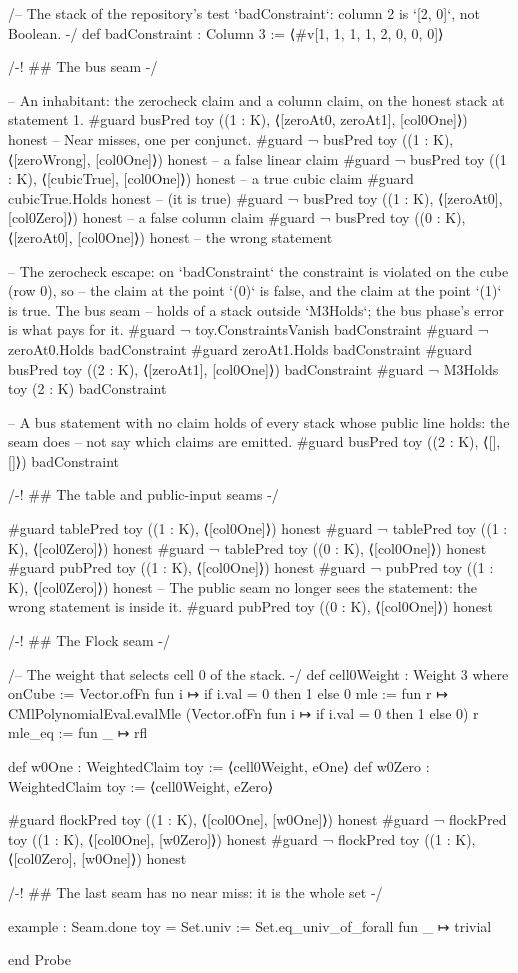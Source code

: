 \begin{leancode}
/-- The stack of the repository's test `badConstraint`: column 2 is `[2, 0]`, not Boolean. -/
def badConstraint : Column 3 := ⟨#v[1, 1, 1, 1, 2, 0, 0, 0]⟩

/-! ## The bus seam -/

-- An inhabitant: the zerocheck claim and a column claim, on the honest stack at statement 1.
#guard busPred toy ((1 : K), ⟨[zeroAt0, zeroAt1], [col0One]⟩) honest
-- Near misses, one per conjunct.
#guard ¬ busPred toy ((1 : K), ⟨[zeroWrong], [col0One]⟩) honest          -- a false linear claim
#guard ¬ busPred toy ((1 : K), ⟨[cubicTrue], [col0One]⟩) honest          -- a true cubic claim
#guard cubicTrue.Holds honest                                            -- (it is true)
#guard ¬ busPred toy ((1 : K), ⟨[zeroAt0], [col0Zero]⟩) honest           -- a false column claim
#guard ¬ busPred toy ((0 : K), ⟨[zeroAt0], [col0One]⟩) honest            -- the wrong statement

-- The zerocheck escape: on `badConstraint` the constraint is violated on the cube (row 0), so
-- the claim at the point `(0)` is false, and the claim at the point `(1)` is true. The bus seam
-- holds of a stack outside `M3Holds`; the bus phase's error is what pays for it.
#guard ¬ toy.ConstraintsVanish badConstraint
#guard ¬ zeroAt0.Holds badConstraint
#guard zeroAt1.Holds badConstraint
#guard busPred toy ((2 : K), ⟨[zeroAt1], [col0One]⟩) badConstraint
#guard ¬ M3Holds toy (2 : K) badConstraint

-- A bus statement with no claim holds of every stack whose public line holds: the seam does
-- not say which claims are emitted.
#guard busPred toy ((2 : K), ⟨[], []⟩) badConstraint

/-! ## The table and public-input seams -/

#guard tablePred toy ((1 : K), ⟨[col0One]⟩) honest
#guard ¬ tablePred toy ((1 : K), ⟨[col0Zero]⟩) honest
#guard ¬ tablePred toy ((0 : K), ⟨[col0One]⟩) honest
#guard pubPred toy ((1 : K), ⟨[col0One]⟩) honest
#guard ¬ pubPred toy ((1 : K), ⟨[col0Zero]⟩) honest
-- The public seam no longer sees the statement: the wrong statement is inside it.
#guard pubPred toy ((0 : K), ⟨[col0One]⟩) honest

/-! ## The Flock seam -/

/-- The weight that selects cell 0 of the stack. -/
def cell0Weight : Weight 3 where
  onCube := Vector.ofFn fun i ↦ if i.val = 0 then 1 else 0
  mle := fun r ↦ CMlPolynomialEval.evalMle (Vector.ofFn fun i ↦ if i.val = 0 then 1 else 0) r
  mle_eq := fun _ ↦ rfl

def w0One : WeightedClaim toy := ⟨cell0Weight, eOne⟩
def w0Zero : WeightedClaim toy := ⟨cell0Weight, eZero⟩

#guard flockPred toy ((1 : K), ⟨[col0One], [w0One]⟩) honest
#guard ¬ flockPred toy ((1 : K), ⟨[col0One], [w0Zero]⟩) honest
#guard ¬ flockPred toy ((1 : K), ⟨[col0Zero], [w0One]⟩) honest

/-! ## The last seam has no near miss: it is the whole set -/

example : Seam.done toy = Set.univ := Set.eq_univ_of_forall fun _ ↦ trivial

end Probe
\end{leancode}

